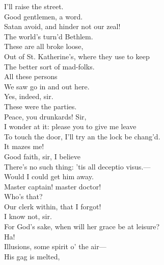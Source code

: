 \documentclass[a4paper,oneside]{memoir}
\begin{document}
\begin{drama*}
\kastrilspeaks I'll raise the street.\\
\lovewitspeaks {} Good gentlemen, a word.\\
\ananiasspeaks Satan avoid, and hinder not our zeal!\\
\lovewitspeaks The world's turn'd Bethlem.\\
\facespeaks {} These are all broke loose,\\
Out of St. Katherine's, where they use to keep\\
The better sort of mad-folks.\\
\neighonespeaks {} All these persons\\
We saw go in and out here.\\
\neightwospeaks {} Yes, indeed, sir.\\
\neighthreespeaks These were the parties.\\
\facespeaks {} Peace, you drunkards! Sir,\\
I wonder at it: please you to give me leave\\
To touch the door, I'll try an the lock be chang'd.\\
\lovewitspeaks It mazes me!\\
\facespeaks {}  Good faith, sir, I believe\\
There's no such thing: 'tis all deceptio visus.---\\
Would I could get him away.\\
\dapperspeaks {}  Master captain! master doctor!\\
\lovewitspeaks Who's that?\\
\facespeaks {} Our clerk within, that I forgot!\\
 I know not, sir.\\
\dapperspeaks {} For God's sake, when will her grace be at leisure?\\
\facespeaks {} Ha!\\
Illusions, some spirit o' the air---\\
 His gag is melted,\\

\end{drama*}
\end{document}
